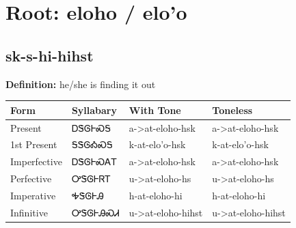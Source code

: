 \documentclass{article}%
\begin{document}
%
\normalsize%
\section*{Root: eloho / elo'o}%
\subsection*{sk-s-hi-hihst}%
\textbf{Definition: }%
he/she is finding it out%
\\[0.5em]%
\begin{tabular}{|l|l|l|l|}%
\hline%
\textbf{Form}&\textbf{Syllabary}&\textbf{With Tone}&\textbf{Toneless}\\%
\hline%
Present&ᎠᏕᎶᎰᏍᎦ&a{-}>at{-}eloho{-}hsk&a{-}>at{-}eloho{-}hsk\\%
1st Present&ᎦᏕᎶᎣᏍᎦ&k{-}at{-}elo'o{-}hsk&k{-}at{-}elo'o{-}hsk\\%
Imperfective&ᎠᏕᎶᎰᏍᎪᎢ&a{-}>at{-}eloho{-}hsk&a{-}>at{-}eloho{-}hsk\\%
Perfective&ᎤᏕᎶᎰᏒᎢ&u{-}>at{-}eloho{-}hs&u{-}>at{-}eloho{-}hs\\%
Imperative&ᎭᏕᎶᎰᎯ&h{-}at{-}eloho{-}hi&h{-}at{-}eloho{-}hi\\%
Infinitive&ᎤᏕᎶᎰᎯᏍᏗ&u{-}>at{-}eloho{-}hihst&u{-}>at{-}eloho{-}hihst\\%
\hline%
\end{tabular}%
\\[1em]%
\end{document}
